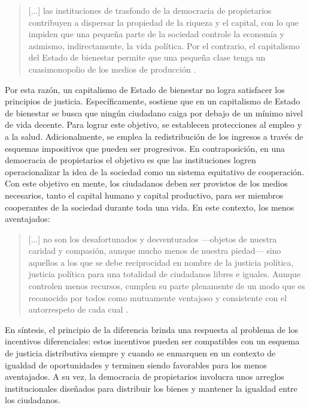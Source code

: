 \vspace{3mm}
\begin{quote}
    [...] las instituciones de trasfondo de la democracia de propietarios contribuyen a dispersar la propiedad de la riqueza y el capital, con lo que impiden que una pequeña parte de la sociedad controle la economía y asimismo, indirectamente, la vida política. Por el contrario, el capitalismo del Estado de bienestar permite que una pequeña clase tenga un cuasimonopolio de los medios de producción \citep[p. 189]{Rawls_2002}.
\end{quote}
\vspace{3mm}

Por esta razón, un capitalismo de Estado de bienestar no logra satisfacer los principios de justicia. Específicamente, \citet{Rawls_2002} sostiene que en un capitalismo de Estado de bienestar se busca que ningún ciudadano caiga por debajo de un mínimo nivel de vida decente. Para lograr este objetivo, se establecen protecciones al empleo y a la salud. Adicionalmente, se emplea la redistribución de los ingresos a través de esquemas impositivos que pueden ser progresivos. En contraposición, en una democracia de propietarios el objetivo es que las instituciones logren operacionalizar la idea de la sociedad como un sistema equitativo de cooperación. Con este objetivo en mente, los ciudadanos deben ser provistos de los medios necesarios, tanto el capital humano y capital productivo, para ser miembros cooperantes de la sociedad durante toda una vida. En este contexto, los menos aventajados:

\vspace{3mm}
\begin{quote}
    [...] no son los desafortunados y desventurados —objetos de nuestra caridad y compasión, aunque mucho menos de nuestra piedad— sino aquellos a los que se debe reciprocidad en nombre de la justicia política, justicia política para una totalidad de ciudadanos libres e iguales. Aunque controlen menos recursos, cumplen su parte plenamente de un modo que es reconocido por todos como mutuamente ventajoso y consistente con el autorrespeto de cada cual \citep[p. 190]{Rawls_2002}.
\end{quote}
\vspace{3mm}

En síntesis, el principio de la diferencia brinda una respuesta al problema de los incentivos diferenciales: estos incentivos pueden ser compatibles con un esquema de justicia distributiva siempre y cuando se enmarquen en un contexto de igualdad de oportunidades y terminen siendo favorables para los menos aventajados. A su vez, la democracia de propietarios involucra unos arreglos institucionales diseñados para distribuir los bienes y mantener la igualdad entre los ciudadanos.

